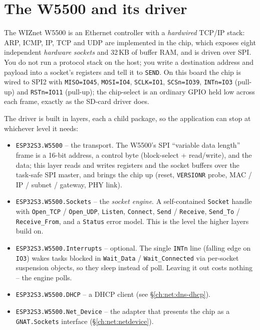\section{The W5500 and its driver}
\label{ch:net:w5500}

The WIZnet W5500 is an Ethernet controller with a \emph{hardwired} TCP/IP stack:
ARP, ICMP, IP, TCP and UDP are implemented in the chip, which exposes eight
independent \emph{hardware sockets} and 32\,KB of buffer RAM, and is driven over
SPI. You do not run a protocol stack on the host; you write a destination address
and payload into a socket's registers and tell it to \texttt{SEND}. On this board
the chip is wired to SPI2 with \texttt{MISO=IO45}, \texttt{MOSI=IO4},
\texttt{SCLK=IO1}, \texttt{SCSn=IO39}, \texttt{INTn=IO3} (pull-up) and
\texttt{RSTn=IO11} (pull-up); the chip-select is an ordinary GPIO held low across
each frame, exactly as the SD-card driver does.

The driver is built in layers, each a child package, so the application can stop at
whichever level it needs:

\begin{itemize}[nosep]
\item \texttt{ESP32S3.W5500} -- the transport. The W5500's SPI ``variable data
length'' frame is a 16-bit address, a control byte (block-select + read/write), and
the data; this layer reads and writes registers and the socket buffers over the
task-safe SPI master, and brings the chip up (reset, \texttt{VERSIONR} probe, MAC /
IP / subnet / gateway, PHY link).
\item \texttt{ESP32S3.W5500.Sockets} -- the \emph{socket engine}. A self-contained
\texttt{Socket} handle with \texttt{Open\_TCP} / \texttt{Open\_UDP},
\texttt{Listen}, \texttt{Connect}, \texttt{Send} / \texttt{Receive},
\texttt{Send\_To} / \texttt{Receive\_From}, and a \texttt{Status} error model. This
is the level the higher layers build on.
\item \texttt{ESP32S3.W5500.Interrupts} -- optional. The single \texttt{INTn} line
(falling edge on \texttt{IO3}) wakes tasks blocked in \texttt{Wait\_Data} /
\texttt{Wait\_Connected} via per-socket suspension objects, so they sleep instead
of poll. Leaving it out costs nothing -- the engine polls.
\item \texttt{ESP32S3.W5500.DHCP} -- a DHCP client (see
\S\ref{ch:net:dns-dhcp}).
\item \texttt{ESP32S3.W5500.Net\_Device} -- the adapter that presents the chip as a
\texttt{GNAT.Sockets} interface (\S\ref{ch:net:netdevice}).
\end{itemize}

